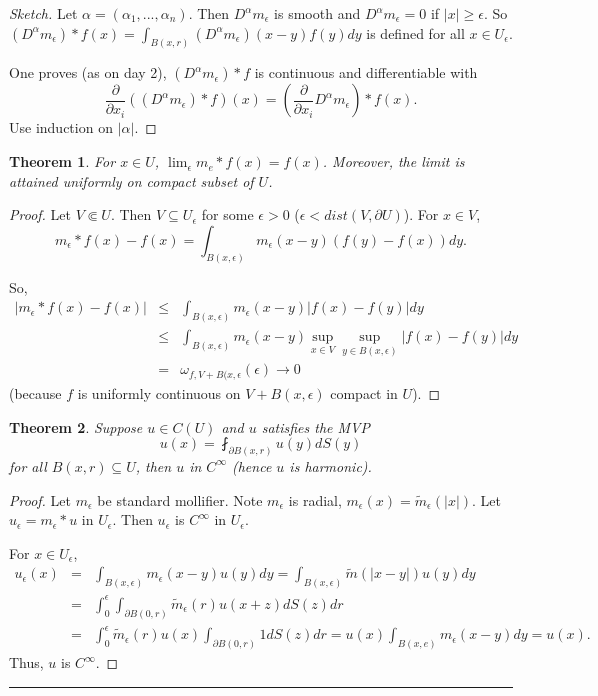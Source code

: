 \documentclass[11pt]{amsart}%
\newtheorem{theorem}{Theorem}
\begin{document}
\begin{proof}[Sketch]
    Let $\alpha=(\alpha_1,...,\alpha_n)$. Then $D^\alpha m_\epsilon$ is smooth and $D^\alpha m_\epsilon =0$ if $\vert x\vert \ge \epsilon$. So $(D^\alpha m_\epsilon)*f(x)=\int_{B(x,r)}(D^\alpha m_\epsilon)(x-y)f(y)dy$ is defined for all $x\in U_\epsilon$.
    
    One proves (as on day 2), $(D^\alpha m_\epsilon)*f$ is continuous and differentiable with
    $$\frac{\partial}{\partial x_i}((D^\alpha m_\epsilon)*f)(x) = (\frac{\partial}{\partial x_i} D^\alpha m_\epsilon)*f(x).$$
    Use induction on $\vert \alpha\vert$.
\end{proof}


\begin{theorem}
    For $x\in U$, $\lim_\epsilon m_e*f(x)=f(x)$. Moreover, the limit is attained uniformly on compact subset of $U$.
\end{theorem}

\begin{proof}
    Let $V \Subset U$. Then $V\subseteq U_\epsilon$ for some $\epsilon>0$ ($\epsilon < dist(V,\partial U)$). For $x\in V$,
    $$m_\epsilon*f(x)-f(x)=\int_{B(x,\epsilon)}m_\epsilon(x-y)(f(y)-f(x))dy.$$
    
    So, 
    \begin{eqnarray*}
        \vert m_\epsilon*f(x)-f(x)\vert &\le& \int_{B(x,\epsilon)} m_\epsilon(x-y)\vert f(x)-f(y)\vert dy\\
            &\le&\int_{B(x,\epsilon)} m_\epsilon(x-y)\sup_{x\in V}\sup_{y\in B(x,\epsilon)} \vert f(x)-f(y)\vert dy\\
            &=&\omega_{f, V+B(x,\epsilon}(\epsilon) \to 0 
    \end{eqnarray*}
    (because $f$ is uniformly continuous on $V+B(x,\epsilon)$ compact in $U$).
\end{proof}

\begin{theorem}
    Suppose $u\in C(U)$ and $u$ satisfies the MVP
    $$u(x)=\fint_{\partial B(x,r)} u(y)dS(y)$$ for all $B(x,r)\subseteq U$, then $u$ in $C^\infty$ (hence $u$ is harmonic).
\end{theorem}
\begin{proof}
    Let $m_\epsilon$ be standard mollifier. Note $m_\epsilon$ is radial, $m_\epsilon(x)=\tilde{m}_\epsilon(\vert x\vert)$. Let $u_\epsilon=m_\epsilon*u$ in $U_\epsilon$. Then $u_\epsilon$ is $C^\infty$ in $U_\epsilon$.
    
    For $x\in U_\epsilon$, 
\begin{eqnarray*}
    u_\epsilon(x)   &=& \int_{B(x,\epsilon)} m_\epsilon(x-y)u(y)dy = \int_{B(x,\epsilon)}\tilde{m}(\vert x-y\vert)u(y) dy\\
    &=& \int_0^\epsilon \int_{\partial B(0,r)} \tilde{m}_\epsilon(r)u(x+z)dS(z)dr\\
    &=& \int_0^\epsilon \tilde{m}_\epsilon (r)u(x)\int_{\partial B(0,r)} 1 dS(z)dr = u(x)\int_{B(x,e)}m_\epsilon(x-y)dy=u(x).
\end{eqnarray*}
Thus, $u$ is $C^\infty$.
\end{proof}
\begin{center}\rule{0.5\linewidth}{\linethickness}\end{center}
\end{document}

